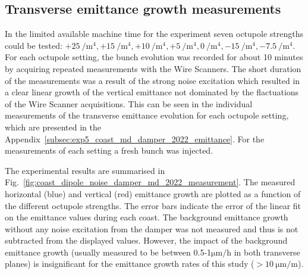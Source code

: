 \subsection{Transverse emittance growth measurements}
In the limited available machine time for the experiment seven octupole strengths could be tested: $+25 \ \mathrm{/m^4}, +15 \ \mathrm{/m^4}, +10 \ \mathrm{/m^4}, +5 \ \mathrm{/m^4}, 0 \ \mathrm{/m^4}, -15 \ \mathrm{/m^4}, -7.5 \ \mathrm{/m^4}$. %
For each octupole setting, the bunch evolution was recorded for about 10 minutes by acquiring repeated measurements with the Wire Scanners. The short duration of the measurements was a result of the strong noise excitation which resulted in a clear linear growth of the vertical emittance not dominated by the flactuations of the Wire Scanner acquisitions. This can be seen in the individual measurements of the transverse emittance evolution for each octupole setting, which are presented in the Appendix~\ref{subsec:exp5_coast_md_damper_2022_emittance}. For the measurements of each setting a fresh bunch was injected. 

The experimental results are summarised in Fig.~\ref{fig:coast_dipole_noise_damper_md_2022_measurement}. The measured horizontal (blue) and vertical (red) emittance growth are plotted as a function of the different octupole strengths. The error bars indicate the error of the linear fit on the emittance values during each coast. The background emittance growth without any noise excitation from the damper was not measured and thus is not subtracted from the displayed values. However, the impact of the background emittance growth (usually measured to be between 0.5-1$\mathrm{\mu m/h}$ in both transverse planes) is insignificant for the emittance growth rates of this study ($ > 10 \ \mathrm{\mu m/m}$).
 


